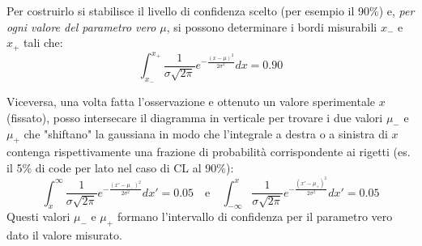 \documentclass[openany,a4paper,12pt]{book}
\theoremstyle{remark}
\begin{document}
Per costruirlo si stabilisce il livello di confidenza scelto (per esempio il 90\%) e, \textit{per ogni valore del parametro vero $\mu$}, si possono determinare i bordi misurabili $x_-$ e $x_+$ tali che:
$$ \int_{x_-}^{x_+} \frac{1}{\sigma\sqrt{2\pi}} e^{-\frac{(x-\mu)^2}{2\sigma^2}} dx = 0.90 $$

Viceversa, una volta fatta l'osservazione e ottenuto un valore sperimentale $x$ (fissato), posso intersecare il diagramma in verticale per trovare i due valori $\mu_-$ e $\mu_+$ che "shiftano" la gaussiana in modo che l'integrale a destra o a sinistra di $x$ contenga rispettivamente una frazione di probabilità corrispondente ai rigetti (es. il 5\% di code per lato nel caso di CL al 90\%):
$$ \int_x^{\infty} \frac{1}{\sigma\sqrt{2\pi}} e^{-\frac{(x'-\mu_-)^2}{2\sigma^2}} dx' = 0.05 \quad \text{e} \quad \int_{-\infty}^x \frac{1}{\sigma\sqrt{2\pi}} e^{-\frac{(x'-\mu_+)^2}{2\sigma^2}} dx' = 0.05 $$
Questi valori $\mu_-$ e $\mu_+$ formano l'intervallo di confidenza per il parametro vero dato il valore misurato.
\end{document}
